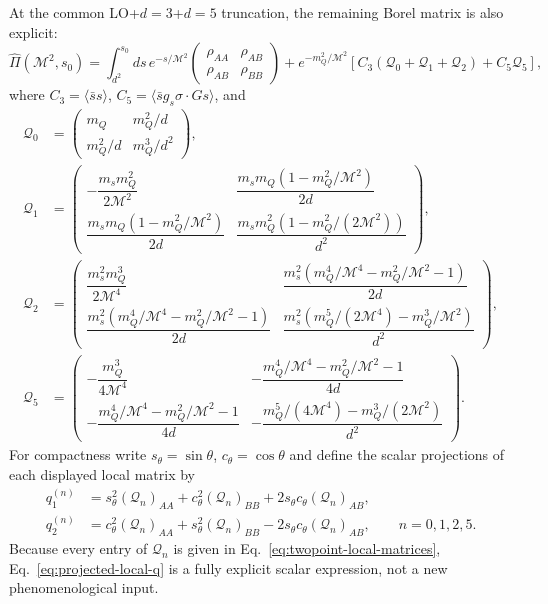 \documentclass[11pt]{article}
\begin{document}
At the common LO+$d=3$+$d=5$ truncation, the remaining Borel matrix is also
explicit:
\begin{equation}
 \widehat\Pi(\mathcal M^2,s_0)=
 \int_{d^2}^{s_0}ds\,e^{-s/\mathcal M^2}
 \begin{pmatrix}\rho_{AA}&\rho_{AB}\\
                 \rho_{AB}&\rho_{BB}\end{pmatrix}
 +e^{-m_Q^2/\mathcal M^2}
 \left[C_3(\mathcal Q_0+\mathcal Q_1+\mathcal Q_2)
       +C_5\mathcal Q_5\right],
 \label{eq:complete-twopoint-matrix}
\end{equation}
where $C_3=\langle\bar ss\rangle$,
$C_5=\langle\bar s g_s\sigma\!\cdot\!G s\rangle$, and
\begin{align}
 \mathcal Q_0&=
 \begin{pmatrix}
 m_Q&m_Q^2/d\\m_Q^2/d&m_Q^3/d^2
 \end{pmatrix},
 \nonumber\\
 \mathcal Q_1&=
 \begin{pmatrix}
 -\dfrac{m_sm_Q^2}{2\mathcal M^2}&
 \dfrac{m_sm_Q(1-m_Q^2/\mathcal M^2)}{2d}\\
 \dfrac{m_sm_Q(1-m_Q^2/\mathcal M^2)}{2d}&
 \dfrac{m_sm_Q^2(1-m_Q^2/(2\mathcal M^2))}{d^2}
 \end{pmatrix},
 \nonumber\\
 \mathcal Q_2&=
 \begin{pmatrix}
 \dfrac{m_s^2m_Q^3}{2\mathcal M^4}&
 \dfrac{m_s^2(m_Q^4/\mathcal M^4-m_Q^2/\mathcal M^2-1)}{2d}\\
 \dfrac{m_s^2(m_Q^4/\mathcal M^4-m_Q^2/\mathcal M^2-1)}{2d}&
 \dfrac{m_s^2(m_Q^5/(2\mathcal M^4)-m_Q^3/\mathcal M^2)}{d^2}
 \end{pmatrix},
 \nonumber\\
 \mathcal Q_5&=
 \begin{pmatrix}
 -\dfrac{m_Q^3}{4\mathcal M^4}&
 -\dfrac{m_Q^4/\mathcal M^4-m_Q^2/\mathcal M^2-1}{4d}\\
 -\dfrac{m_Q^4/\mathcal M^4-m_Q^2/\mathcal M^2-1}{4d}&
 -\dfrac{m_Q^5/(4\mathcal M^4)-m_Q^3/(2\mathcal M^2)}{d^2}
 \end{pmatrix}.
 \label{eq:twopoint-local-matrices}
\end{align}
For compactness write $s_\theta=\sin\theta$, $c_\theta=\cos\theta$ and define
the scalar projections of each displayed local matrix by
\begin{align}
 q_1^{(n)}
 &=s_\theta^2(\mathcal Q_n)_{AA}
   +c_\theta^2(\mathcal Q_n)_{BB}
   +2s_\theta c_\theta(\mathcal Q_n)_{AB},\nonumber\\
 q_2^{(n)}
 &=c_\theta^2(\mathcal Q_n)_{AA}
   +s_\theta^2(\mathcal Q_n)_{BB}
   -2s_\theta c_\theta(\mathcal Q_n)_{AB},
 \qquad n=0,1,2,5 .
 \label{eq:projected-local-q}
\end{align}
Because every entry of $\mathcal Q_n$ is given in
Eq.~\eqref{eq:twopoint-local-matrices}, Eq.~\eqref{eq:projected-local-q} is a
fully explicit scalar expression, not a new phenomenological input.
\end{document}
